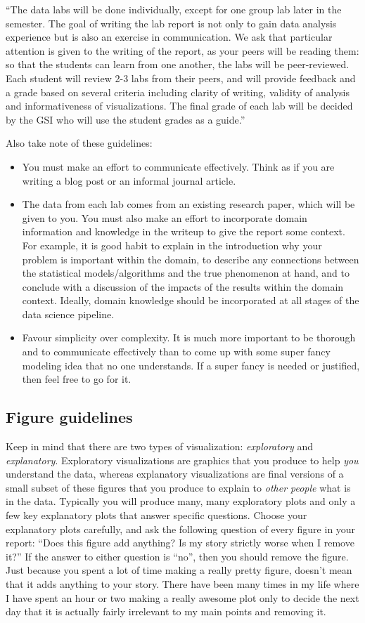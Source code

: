 \documentclass[letterpaper,12pt]{article}
\begin{document}
``The data labs will be done individually, except for one
group lab later in the semester. The goal of writing the lab report is not only to gain data analysis
experience but is also an exercise in communication. We ask that particular attention is given to
the writing of the report, as your peers will be reading them: so that the students can learn from
one another, the labs will be peer-reviewed. Each student will review 2-3 labs from their peers, and
will provide feedback and a grade based on several criteria including clarity of writing, validity of
analysis and informativeness of visualizations. The final grade of each lab will be decided by the
GSI who will use the student grades as a guide.''

Also take note of these guidelines:
\begin{itemize}
    \item You must make an effort to communicate effectively. Think as if you are writing a blog post or an informal journal article.
    \item The data from each lab comes from an existing research paper, which will be given to you. You must also make an effort to incorporate domain information and knowledge in the writeup to give the report some context. For example, it is good habit to explain in the introduction why your problem is important within the domain, to describe any connections between the statistical models/algorithms and the true phenomenon at hand, and to conclude with a discussion of the impacts of the results within the domain context. Ideally, domain knowledge should be incorporated at all stages of the data science pipeline.
    \item Favour simplicity over complexity. It is much more important to be thorough and to communicate effectively than to come up with some super fancy modeling idea that no one understands. If a super fancy is needed or justified, then feel free to go for it.
\end{itemize}

\subsection{Figure guidelines}
Keep in mind that there are two types of visualization: \textit{exploratory} and \textit{explanatory}. Exploratory visualizations are graphics that you produce to help \textit{you} understand the data, whereas explanatory visualizations are final versions of a small subset of these figures that you produce to explain to \textit{other people} what is in the data. Typically you will produce many, many exploratory plots and only a few key explanatory plots that answer specific questions. Choose your explanatory plots carefully, and ask the following question of every figure in your report: ``Does this figure add anything? Is my story strictly worse when I remove it?'' If the answer to either question is ``no'', then you should remove the figure. Just because you spent a lot of time making a really pretty figure, doesn't mean that it adds anything to your story. There have been many times in my life where I have spent an hour or two making a really awesome plot only to decide the next day that it is actually fairly irrelevant to my main points and removing it.
\end{document}
